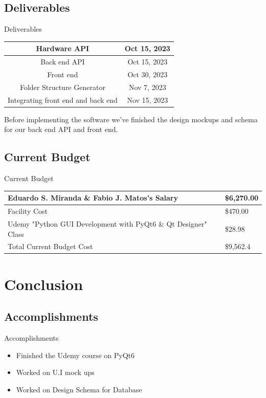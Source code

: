 \documentclass[17pt, aspectratio=169]{beamer}
\begin{document}
\subsection*{Deliverables}
\begin{frame}{Deliverables}
	\begin{center}
		\begin{tabular}{||c | c||}
			\hline
			Hardware API & Oct 15, 2023 \\
			\hline
			Back end API & Oct 15, 2023 \\
			\hline
			Front end    & Oct 30, 2023 \\
			\hline
			Folder Structure Generator & Nov 7, 2023\\
			\hline
			Integrating front end and back end & Nov 15, 2023 \\
			\hline
		\end{tabular}
	\end{center}
	Before implementing the software we've finished the design mockups and schema for our back end API and front end.
\end{frame}
\subsection*{Current Budget}
\begin{frame}{Current Budget}
	\begin{center}
		\begin{tabular}{||m{} | m{} ||}
			\hline
			Eduardo S. Miranda \& Fabio J. Matos's Salary                  & \$6,270.00 \\
			\hline
			Facility Cost                                                  & \$470.00   \\
			\hline
			Udemy "Python GUI Development with PyQt6 \& Qt Designer" Class & \$28.98    \\
			\hline
			Total Current Budget Cost                                      & \$9,562.4  \\
			\hline
		\end{tabular}
	\end{center}
\end{frame}
\section{Conclusion}
\subsection{Accomplishments}
\begin{frame}{Accomplishments}
	\begin{itemize}
		\item Finished the Udemy course on PyQt6
		\item Worked on U.I mock ups
		\item Worked on Design Schema for Database
	\end{itemize}
\end{frame}
\end{document}
